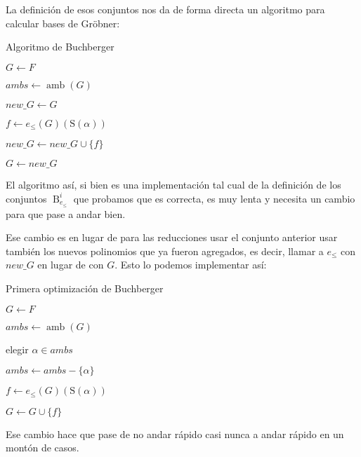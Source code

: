 \documentclass{amsbook} %
\theoremstyle{customstyle}
\theoremstyle{factstyle}
\DeclareMathOperator{\amb}{amb}
\renewcommand{\S}{\text{S}}
\DeclareMathOperator{\B}{B}
\begin{document}
La definición de esos conjuntos nos da de forma directa un algoritmo para calcular bases de Gröbner:

\begin{algorithm}[H] %
  \caption{Algoritmo de Buchberger}\label{alg:Buchberger}
  $G ← F$

  \Loop{} {
    $ambs ← \amb(G)$

    $new\_G ← G$

     {
      $f ← e_≤(G)(\S(α))$

       {
        $new\_G ← new\_G ∪ \{f\}$
      }
    }

     {
      \Break
    }

    $G ← new\_G$
  }
\end{algorithm}

El algoritmo así, si bien es una implementación tal cual de la definición de los conjuntos $\B_{e_≤}^i$ que probamos que es correcta, es muy lenta y necesita un cambio para que pase a andar bien.

Ese cambio es en lugar de para las reducciones usar el conjunto anterior usar también los nuevos polinomios que ya fueron agregados, es decir, llamar a $e_≤$ con $new\_G$ en lugar de con $G$. Esto lo podemos implementar así:

\begin{algorithm}[H] %
  \caption{Primera optimización de Buchberger}\label{alg:Buchberger optimización 1}
  $G ← F$

  $ambs ← \amb(G)$

   {
    elegir $α ∈ ambs$

    $ambs ← ambs - \{α\}$

    $f ← e_≤(G)(\S(α))$

     {
      $G ← G ∪ \{f\}$
    }
  }

\end{algorithm}

Ese cambio hace que pase de no andar rápido casi nunca a andar rápido en un montón de casos.
\end{document}
